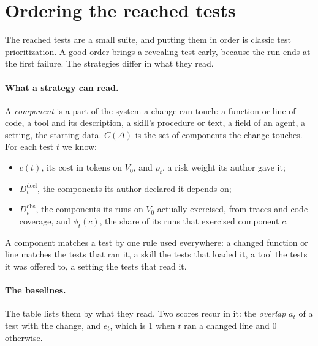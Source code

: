 \documentclass[11pt,a4paper]{article}
\newcommand{\Ddecl}{D^{\mathrm{decl}}_t}
\newcommand{\Dobs}{D^{\mathrm{obs}}_t}
\begin{document}
\section{Ordering the reached tests}
\label{sec:order}

The reached tests are a small suite, and putting them in order is classic test prioritization. A good order brings
a revealing test early, because the run ends at the first failure. The strategies differ in what they read.

\paragraph{What a strategy can read.} A \emph{component} is a part of the system a change can touch: a function or
line of code, a tool and its description, a skill's procedure or text, a field of an agent, a setting, the
starting data. $C(\Delta)$ is the set of components the change touches. For each test $t$ we know:
\begin{itemize}
  \item $c(t)$, its cost in tokens on $V_0$, and $\rho_t$, a risk weight its author gave it;
  \item $\Ddecl$, the components its author declared it depends on;
  \item $\Dobs$, the components its runs on $V_0$ actually exercised, from traces and code coverage, and
        $\phi_t(c)$, the share of its runs that exercised component $c$.
\end{itemize}
A component matches a test by one rule used everywhere: a changed function or line matches the tests that ran it, a
skill the tests that loaded it, a tool the tests it was offered to, a setting the tests that read it.

\paragraph{The baselines.} The table lists them by what they read. Two scores recur in it: the \emph{overlap} $a_t$
of a test with the change, and $e_t$, which is 1 when $t$ ran a changed line and 0 otherwise.
\end{document}
